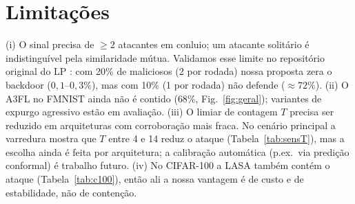 \section{Limitações}\label{sec:limits}
(i) O sinal precisa de $\geq 2$ atacantes em conluio; um atacante solitário é indistinguível pela
similaridade mútua. Validamos esse limite no repositório original do LP \cite{lp}: com 20\% de
maliciosos (2 por rodada) nossa proposta zera o backdoor ($0{,}1$--$0{,}3\%$), mas com 10\% (1 por
rodada) não defende ($\approx 72\%$). 
(ii) O A3FL no FMNIST ainda não é contido ($68\%$, Fig.~\ref{fig:geral}); variantes de expurgo
agressivo estão em avaliação. (iii) O limiar de contagem $T$ precisa ser reduzido em arquiteturas com
corroboração mais fraca. No cenário principal a varredura mostra que $T$ entre 4 e 14 reduz o ataque
(Tabela~\ref{tab:sensT}), mas a escolha ainda é feita por arquitetura; a calibração automática (p.ex.\ via
predição conformal) é trabalho futuro. (iv) No CIFAR-100 a LASA também contém o ataque
(Tabela~\ref{tab:c100}), então ali a nossa vantagem é de custo e de estabilidade, não de contenção.
